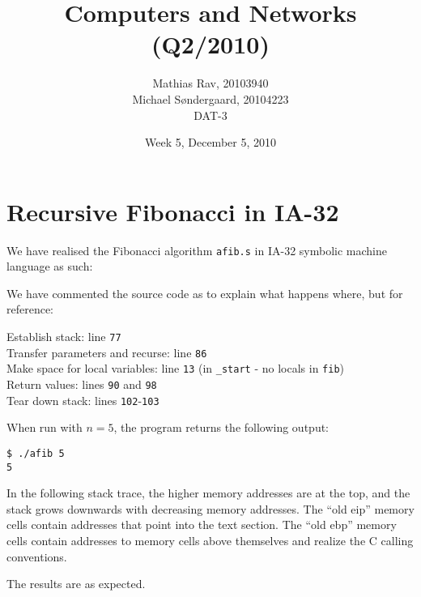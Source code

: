 \documentclass[12pt,a4paper]{article}
\title{Computers and Networks (Q2/2010)}
\author{Mathias Rav, 20103940 \\
		Michael Søndergaard, 20104223 \\
		DAT-3}
\date{Week 5, December 5, 2010}
\begin{document}
\maketitle

\section{Recursive Fibonacci in IA-32}
We have realised the Fibonacci algorithm \texttt{afib.s} in IA-32 symbolic machine language as such:



We have commented the source code as to explain what happens where, but for reference:

Establish stack: line \texttt{77} \\
Transfer parameters and recurse: line \texttt{86} \\
Make space for local variables: line \texttt{13} (in \texttt{\_start} - no locals in \texttt{fib}) \\
Return values: lines \texttt{90} and \texttt{98} \\
Tear down stack: lines \texttt{102}-\texttt{103}

When run with $n=5$, the program returns the following output:
\lstset{numbers=none}
\begin{lstlisting}
$ ./afib 5  
5
\end{lstlisting}

In the following stack trace, the higher memory addresses are at the top, and
the stack grows downwards with decreasing memory addresses. The ``old eip''
memory cells contain addresses that point into the text section. The ``old
ebp'' memory cells contain addresses to memory cells above themselves and
realize the C calling conventions.



The results are as expected.
\end{document}
